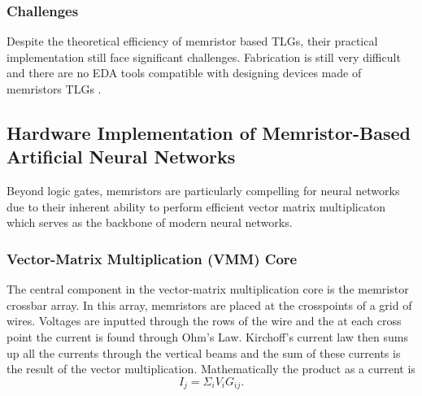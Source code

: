 \documentclass[sigconf]{acmart}
\begin{document}
\subsubsection{Challenges}
Despite the theoretical efficiency of memristor based TLGs, 
their practical implementation still face significant challenges. 
Fabrication is still very difficult and there are no EDA tools 
compatible with designing devices made of memristors TLGs \cite{papandroulidakis2019practical}. 

\subsection{Hardware Implementation of Memristor-Based Artificial Neural Networks}
Beyond logic gates, memristors are particularly compelling for 
neural networks due to their inherent ability to perform efficient 
vector matrix multiplicaton which serves as the backbone of 
modern neural networks. 

\subsubsection{Vector-Matrix Multiplication (VMM) Core}
The central component in the vector-matrix multiplication core 
is the memristor crossbar array. In this array, memristors are placed
at the crosspoints of a grid of wires. Voltages are inputted through
the rows of the wire and the at each cross point the current is 
found through Ohm's Law. Kirchoff's current law then sums up all the 
currents through the vertical beams and the sum of these currents 
is the result of the vector multiplication. Mathematically the
product as a current is 
\[I_j = \Sigma_iV_iG_{ij}.\]
\end{document}
